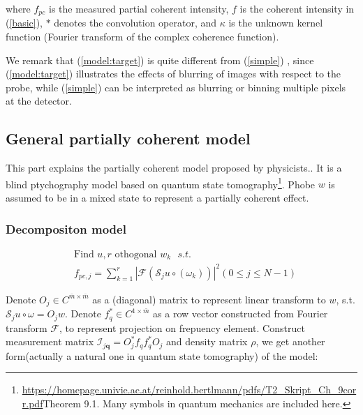 \documentclass{article}
\numberwithin{equation}{section}
\begin{document}
where $f_{p c}$ is the measured partial coherent intensity, $f$ is the coherent intensity in (\ref{basic}), $*$ denotes the convolution operator, and $\kappa$ is the unknown kernel function (Fourier transform of the complex coherence function). 



We remark that (\ref{model:target}) is quite different from
 (\ref{simple}) , since (\ref{model:target}) illustrates the effects of blurring of images with respect to the probe, while (\ref{simple}) can be interpreted as blurring or binning multiple pixels at the detector.

\subsection{General partially coherent model}
This part explains the partially coherent model proposed by physicists.\cite{mix}.   It is a blind ptychography model based on quantum state tomography\footnote{\url{https://homepage.univie.ac.at/reinhold.bertlmann/pdfs/T2_Skript_Ch_9corr.pdf}Theorem 9.1. Many symbols in quantum mechanics are included here.}.  Phobe $w$ is assumed to be in a mixed state to represent a partially coherent effect.


\subsubsection{Decompositon model}

 
\begin{equation}
\begin{aligned}
&\mbox{Find } u, r \mbox{ othogonal $w_k$   }s.t. \\
&f_{p c, j}=\sum_{k=1}^r \left|\mathcal{F}\left( \mathcal{S}_{j} u \circ \left(\omega_k\right) \right)\right|^{2} (0\leq j \leq N-1)
\label{model: general}
\end{aligned}
\end{equation}

 


Denote $O_j \in C^{\bar{m} \times \bar{m}}$ as a (diagonal) matrix to represent linear transform to $w$, s.t. $\mathcal{S}_{j} u \circ \omega = O_j w$. Denote $f_q^* \in C^{1 \times \bar{m}}$ as a row vector  constructed from Fourier transform $\mathcal{F}$, to represent projection on frepuency element. Construct measurement matrix $ \mathcal{I}_{j \mathbf{q}} = O_j^*f_qf_q^*O_j$ and density matrix $\rho$, we get another form(actually a natural one in quantum state tomography) of the model:
\end{document}
